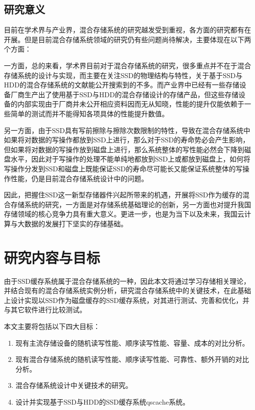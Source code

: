 \subsection{研究意义}

目前在学术界与产业界，混合存储系统的研究越发受到重视，各方面的研究都有在开展。但是目前混合存储系统领域的研究仍有些问题尚待解决，主要体现在以下两个方面：

一方面，总的来看，学术界目前对于混合存储系统的研究，很多重点并不在于混合存储系统的设计与实现，而主要在关注SSD的物理结构与特性，关于基于SSD与HDD的混合存储系统的文献\cite{guerra2011cost, kim2011hybridstore, 杨濮源2012一种时间敏感的, 陈震37基于磁盘和固态硬盘的混合存储系统研究综述}能公开搜索到的不多。而产业界中已经有一些存储设备厂商生产出了使用基于SSD与HDD的混合存储设计的存储产品，但这些存储设备的内部实现由于厂商并未公开相应资料因而无从知晓，性能的提升仅能依赖于一些简单的测试而并不能得知各项具体的性能提升数值。

另一方面，由于SSD具有写前擦除与擦除次数限制的特性，导致在混合存储系统中如果将对数据的写操作都放到SSD上进行，那么对于SSD的寿命势必会产生影响，但如果将对数据的写操作放到磁盘上进行，那么系统整体的写性能必然会下降到磁盘水平，因此对于写操作的处理不能单纯地都放到SSD上或都放到磁盘上，如何将写操作分发到SSD和磁盘上既能保证SSD的寿命尽可能长又能保证系统整体的写操作性能，仍是目前混合存储系统设计中的问题。

因此，把握住SSD这一新型存储器件兴起所带来的机遇，开展将SSD作为缓存的混合存储系统的研究，一方面是对存储系统基础理论的创新，另一方面也对提升我国存储领域的核心竞争力具有重大意义。更进一步，也是为当下以及未来，我国云计算与大数据的发展打下坚实的存储基础。

\section{研究内容与目标}

由于SSD缓存系统属于混合存储系统的一种，因此本文将通过学习存储相关理论，并结合现有的混合存储系统实例分析，研究混合存储系统中的关键技术，在此基础上设计实现以SSD作为磁盘缓存的SSD缓存系统，对其进行测试、完善和优化，并与其它软件进行比较测试。

本文主要将包括以下四大目标：
\begin{enumerate}[wide]
    \item 现有主流存储设备的随机读写性能、顺序读写性能、容量、成本的对比分析。
    \item 现有混合存储系统的随机读写性能、顺序读写性能、可靠性、额外开销的对比分析。
    \item 混合存储系统设计中关键技术的研究。
    \item 设计并实现基于SSD与HDD的SSD缓存系统qscache系统。
\end{enumerate}

